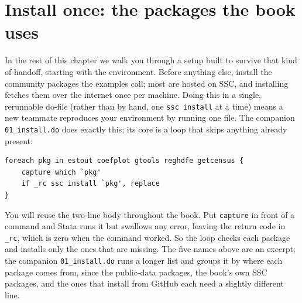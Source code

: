 \section{Install once: the packages the book uses}\label{sec:ch02-install}
In the rest of this chapter we walk you through a setup built to survive that kind of handoff, starting with the environment. Before anything else, install the community packages the examples call; most are hosted on SSC, and installing fetches them over the internet once per machine. Doing this in a single, rerunnable do-file (rather than by hand, one \texttt{ssc install} at a time) means a new teammate reproduces your environment by running one file. The companion \texttt{01\_install.do} does exactly this; its core is a loop that skips anything already present:
\par
{\footnotesize
\begin{verbatim}
foreach pkg in estout coefplot gtools reghdfe getcensus {
    capture which `pkg'
    if _rc ssc install `pkg', replace
}
\end{verbatim}
}
You will reuse the two-line body throughout the book. Put \texttt{capture} in front of a command and Stata runs it but swallows any error, leaving the return code in \texttt{\_rc}, which is zero when the command worked. So the loop checks each package and installs only the ones that are missing. The five names above are an excerpt; the companion \texttt{01\_install.do} runs a longer list and groups it by where each package comes from, since the public-data packages, the book's own SSC packages, and the ones that install from GitHub each need a slightly different line.

